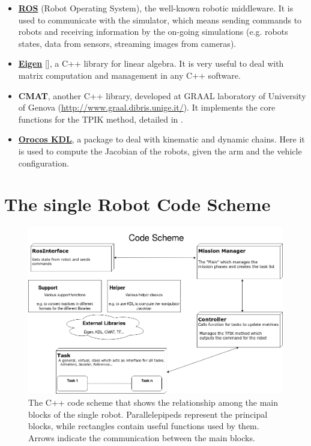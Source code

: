 \begin{itemize}
	\item \href{http://www.ros.org/}{\textbf{ROS}} (Robot Operating System), the well-known robotic middleware. It is used to communicate with the simulator, which means sending commands to robots and receiving information by the on-going simulations (e.g. robots states, data from sensors, streaming images from cameras).
	
	\item \href{http://eigen.tuxfamily.org/index.php?title=Main_Page}{\textbf{Eigen}} [\cite{eigen}], a C++ library for linear algebra. It is very useful to deal with matrix computation and management in any C++ software.
	
	\item \textbf{CMAT}, another C++ library, developed at GRAAL laboratory of University of Genova (\url{http://www.graal.dibris.unige.it/}). It implements the core functions for the TPIK method, detailed in \cite{IntroMaris1}.
	
	\item \href{http://www.orocos.org/kdl}{\textbf{Orocos KDL}}, a package to deal with kinematic and dynamic chains. Here it is used to compute the Jacobian of the robots, given the arm and the vehicle configuration.
\end{itemize}

\section{The single Robot Code Scheme}
\begin{figure}[H]
	\begin{center}
		\includegraphics[width=1\columnwidth]{CodeScheme_single.png}
		\caption[C++ Code Scheme for the single robot]{The C++ code scheme that shows the relationship among the main blocks of the single robot. Parallelepipeds represent the principal blocks, while rectangles contain useful functions used by them. Arrows indicate the communication between the main blocks.}
		\label{fig:codeSchemeSingle}
	\end{center}
\end{figure}

